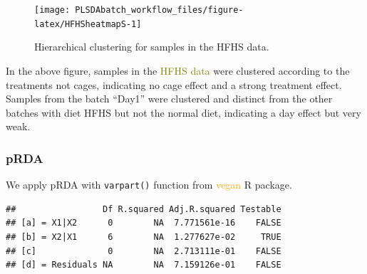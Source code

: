 \documentclass[
]{book}
\newenvironment{Shaded}{\begin{snugshade}}{\end{snugshade}}
\newcommand{\AttributeTok}[1]{\textcolor[rgb]{0.77,0.63,0.00}{#1}}
\newcommand{\FunctionTok}[1]{\textcolor[rgb]{0.00,0.00,0.00}{#1}}
\newcommand{\NormalTok}[1]{#1}
\newcommand{\OtherTok}[1]{\textcolor[rgb]{0.56,0.35,0.01}{#1}}
\newcommand{\SpecialCharTok}[1]{\textcolor[rgb]{0.00,0.00,0.00}{#1}}
\begin{document}
\begin{figure}

{\centering \texttt{[image: PLSDAbatch\_workflow\_files/figure-latex/HFHSheatmapS-1]} 

}

\caption{Hierarchical clustering for samples in the HFHS data.}\label{fig:HFHSheatmapS}
\end{figure}

In the above figure, samples in the \textcolor{olive}{HFHS data} were clustered according to the treatments not cages, indicating no cage effect and a strong treatment effect. Samples from the batch ``Day1'' were clustered and distinct from the other batches with diet HFHS but not the normal diet, indicating a day effect but very weak.

\hypertarget{prda-2}{%
\subsubsection{pRDA}\label{prda-2}}

We apply pRDA with \texttt{varpart()} function from \textcolor{orange}{vegan} R package.

\begin{Shaded}
\end{Shaded}

\begin{verbatim}
##                 Df R.squared Adj.R.squared Testable
## [a] = X1|X2      0        NA  7.771561e-16    FALSE
## [b] = X2|X1      6        NA  1.277627e-02     TRUE
## [c]              0        NA  2.713111e-01    FALSE
## [d] = Residuals NA        NA  7.159126e-01    FALSE
\end{verbatim}
\end{document}
